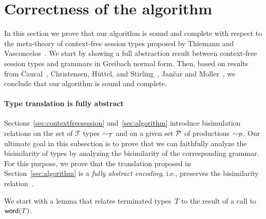 \section{Correctness of the algorithm}
\label{sec:soundness}

In this section we prove that our algorithm is sound and complete
with respect to the meta-theory of context-free session types proposed
by Thiemann and Vasconcelos~\cite{thiemann2016context}.
%
We start by showing a full abstraction result between context-free
session types and grammars in Greibach normal form.
%
Then, based on results from Caucal~\cite{caucal1986decidabilite},
Christensen, H{\"{u}}ttel, and
Stirling~\cite{DBLP:journals/iandc/ChristensenHS95}, Jan{\v{c}}ar and
Moller~\cite{janvcar1999techniques}, we conclude that our algorithm is
sound and complete.

\paragraph{Type translation is fully abstract}

Sections~\ref{sec:contextfreesession} and~\ref{sec:algorithm}
introduce bisimulation relations on the set of $\mathcal T$ types
$\sim_\mathcal T$ and on a given set $\mathcal P$ of productions
$\sim_\mathcal P$.  Our ultimate goal in this subsection is to prove that
we can faithfully analyze the bisimilarity of types by analyzing the
bisimilarity of the corresponding grammar. For this purpose, we prove
that the translation proposed in Section~\ref{sec:algorithm} is a
\emph{fully abstract encoding}, i.e., preserves the bisimilarity
relation~\cite{gorla2016full}.


We start with a lemma that relates terminated types~$T$ to the result 
of a call to $\mathsf{word}(T)$.

